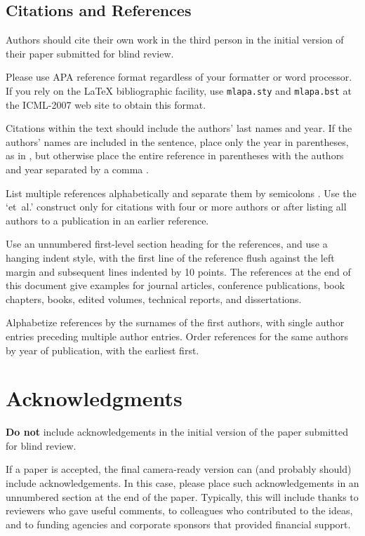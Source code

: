 \documentclass{article}
\begin{document}
\subsection{Citations and References} 

Authors should cite their own work in the third person
in the initial version of their paper submitted for blind review.

Please use APA reference format regardless of your formatter
or word processor. If you rely on the \LaTeX\/ bibliographic 
facility, use {\tt mlapa.sty} and {\tt mlapa.bst} 
at the ICML-2007 web site to obtain this format.

Citations within the text should include the authors' last names and
year. If the authors' names are included in the sentence, place only
the year in parentheses, as in , but otherwise 
place the entire reference in parentheses with the authors and year
separated by a comma \cite{jones:mlj94}.

List multiple references alphabetically and separate them by semicolons 
\cite{jones:mlj94,veloso:bkchapter93}. Use the `et~al.' construct only 
for citations with four or more authors or after listing all authors
to a publication in an earlier reference.

Use an unnumbered first-level section heading for the references, and 
use a hanging indent style, with the first line of the reference flush
against the left margin and subsequent lines indented by 10 points. 
The references at the end of this document give examples for journal
articles, conference publications, book chapters, books, edited volumes, 
technical reports, and dissertations. 

Alphabetize references by the surnames of the first authors, with
single author entries preceding multiple author entries. Order
references for the same authors by year of publication, with the
earliest first.


\section*{Acknowledgments} 
 
\textbf{Do not} include acknowledgements in the initial version of
the paper submitted for blind review.

If a paper is accepted, the final camera-ready version can (and
probably should) include acknowledgements. In this case, please
place such acknowledgements in an unnumbered section at the
end of the paper. Typically, this will include thanks to reviewers
who gave useful comments, to colleagues who contributed to the ideas, 
and to funding agencies and corporate sponsors that provided financial 
support.  
\end{document}
